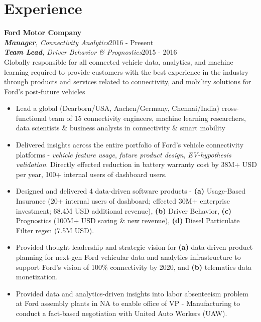 \documentclass[letterpaper,11pt]{article}
\begin{document}
{\section{Experience}}
\textbf{Ford Motor Company}
      \\
       \emph{\textbf{Manager}, Connectivity Analytics}\hfill {2016 - Present}\\
       \emph{\textbf{Team Lead}, Driver Behavior \& Prognostics}\hfill {2015 - 2016}\\[1mm]
       Globally responsible for all connected vehicle data, analytics, and machine learning required to provide customers with the best experience in the industry through products and services related to connectivity, and mobility solutions for Ford's post-future vehicles \\[2mm]
\begin{itemize}[leftmargin=.2in]
 \setlength{\itemsep}{0pt}
 \setlength\itemsep{1mm}
 \item Lead a global (Dearborn/USA, Aachen/Germany, Chennai/India) cross-functional team of 15 connectivity engineers, machine learning researchers, data scientists \& business analysts in connectivity \& smart mobility 
\item Delivered insights across the entire portfolio of Ford's vehicle connectivity platforms - \emph{vehicle feature usage}, \emph{future product design}, \emph{EV-hypothesis validation}. Directly effected reduction in battery warranty cost by 38M+ USD per year, 100+ internal users of dashboard users.
\item Designed and delivered 4 data-driven software products - \textbf{(a)} Usage-Based Insurance (20+ internal users of dashboard; effected 30M+ enterprise investment; 68.4M USD additional revenue), \textbf{(b)} Driver Behavior, \textbf{(c)} Prognostics (100M+ USD saving \& new revenue), \textbf{(d)} Diesel Particulate Filter regen (7.5M USD).
\item Provided thought leadership and strategic vision for \textbf{(a)} data driven product planning for next-gen Ford vehicular data and analytics infrastructure to support Ford's vision of  100\% connectivity by 2020, and \textbf{(b)} telematics data monetization.
\item Provided data and analytics-driven insights into labor absenteeism problem at Ford assembly plants in NA to enable office of VP - Manufacturing to conduct a fact-based negotiation with United Auto Workers (UAW).
 \end{itemize}
\end{document}
